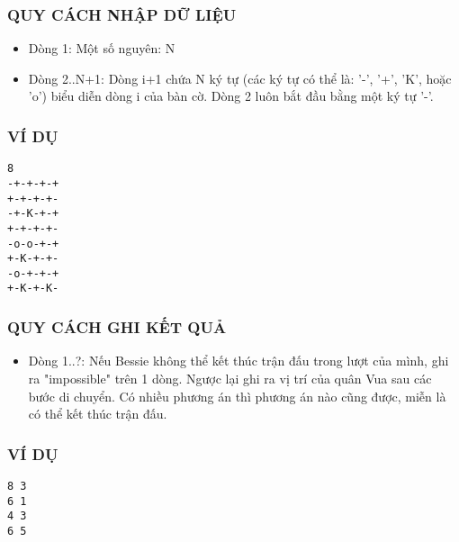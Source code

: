 \subsubsection{   QUY CÁCH NHẬP DỮ LIỆU  }
\begin{itemize}
	\item     Dòng 1: Một số nguyên: N   
	\item     Dòng 2..N+1: Dòng i+1 chứa N ký tự (các ký tự có thể là: '-', '+',         'K', hoặc 'o') biểu diễn dòng i của bàn cờ. Dòng 2 luôn          bắt đầu bằng một ký tự '-'.   
\end{itemize}

\subsubsection{   VÍ DỤ  }
\begin{verbatim}
8
-+-+-+-+
+-+-+-+-
-+-K-+-+
+-+-+-+-
-o-o-+-+
+-K-+-+-
-o-+-+-+
+-K-+-K-
\end{verbatim}

\subsubsection{   QUY CÁCH GHI KẾT QUẢ  }
\begin{itemize}
	\item     Dòng 1..?: Nếu Bessie không thể kết thúc trận đấu trong lượt của mình, ghi ra         "impossible" trên 1 dòng. Ngược lại ghi ra vị trí của quân Vua sau các bước         di chuyển. Có nhiều phương án thì phương án nào cũng được, miễn là          có thể kết thúc trận đấu.   
\end{itemize}

\subsubsection{   VÍ DỤ  }
\begin{verbatim}
8 3
6 1
4 3
6 5
\end{verbatim}
